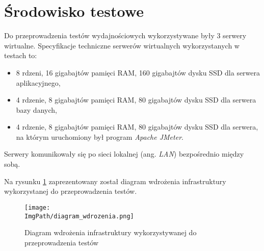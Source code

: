 \section{Środowisko testowe}
Do przeprowadzenia testów wydajnościowych wykorzystywane były 3 serwery wirtualne. Specyfikacje techniczne serwerów wirtualnych wykorzystanych w testach to: 
\begin{itemize}
    \item 8 rdzeni, 16 gigabajtów pamięci RAM, 160 gigabajtów dysku SSD dla serwera aplikacyjnego,
    \item 4 rdzenie, 8 gigabajtów pamięci RAM, 80 gigabajtów dysku SSD dla serwera bazy danych, 
    \item 4 rdzenie, 8 gigabajtów pamięci RAM, 80 gigabajtów dysku SSD dla serwera, na którym uruchomiony był program \textsl{Apache JMeter}.
\end{itemize}
Serwery komunikowały się po sieci lokalnej (ang. \textsl{LAN}) bezpośrednio między sobą.

Na rysunku \ref{fig:deployment_diagram} zaprezentowany został diagram wdrożenia infrastruktury wykorzystanej do przeprowadzenia testów.
\begin{figure}[!ht]
\centering
\texttt{[image: \\ImgPath/diagram\_wdrozenia.png]}
\caption{Diagram wdrożenia infrastruktury wykorzystywanej do przeprowadzenia testów}
\label{fig:deployment_diagram}
\end{figure}

